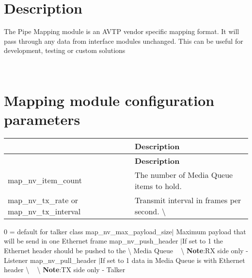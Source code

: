 \section*{Description}

The Pipe Mapping module is an A\+V\+TP vendor specific mapping format. It will pass through any data from interface modules unchanged. This can be useful for development, testing or custom solutions

~\newline
 \section*{Mapping module configuration parameters}

\tabulinesep=1mm
\begin{longtabu} spread 0pt [c]{*2{|X[-1]}|}
\hline
{}&{\bf Description  }\\
\endfirsthead
\hline
\endfoot
\hline
{}&{\bf Description  }\\
\endhead
map\+\_\+nv\+\_\+item\+\_\+count &The number of Media Queue items to hold. \\
map\+\_\+nv\+\_\+tx\+\_\+rate or map\+\_\+nv\+\_\+tx\+\_\+interval &Transmit interval in frames per second. \textbackslash{} \\
\end{longtabu}
0 = default for talker class map\+\_\+nv\+\_\+max\+\_\+payload\+\_\+size$\vert$ Maximum payload that will be send in one Ethernet frame map\+\_\+nv\+\_\+push\+\_\+header $\vert$\+If set to 1 the Ethernet header should be pushed to the \textbackslash{} Media Queue ~\newline
 \textbackslash{} {\bfseries Note}\+:RX side only -\/ Listener map\+\_\+nv\+\_\+pull\+\_\+header $\vert$\+If set to 1 data in Media Queue is with Ethernet header \textbackslash{} ~\newline
 \textbackslash{} {\bfseries Note}\+:TX side only -\/ Talker 